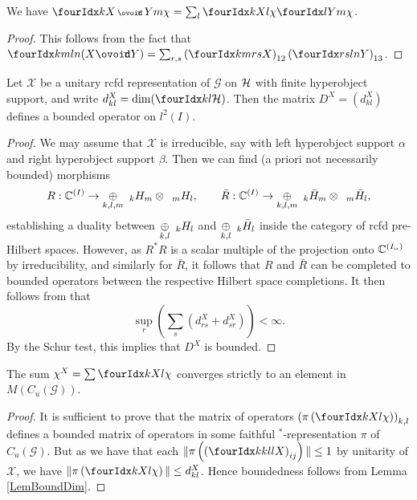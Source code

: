  \begin{Lem}\label{LemBoundDim} We have $\Gr{\chi}{}{X\smCirct Y}{k}{m}= \sum_l \Gr{\chi}{}{X}{k}{l}\Gr{\chi}{}{Y}{l}{m}$.
 \end{Lem}
 
 \begin{proof} 
 This follows from the fact that $\Gr{(X\Circt Y)}{k}{l}{m}{n} = \sum_{r,s} \left(\Gr{X}{k}{r}{m}{s}\right)_{12} \left(\Gr{Y}{r}{l}{s}{n}\right)_{13}$.
 \end{proof}
 
 \begin{Lem} Let $\mathscr{X}$ be a unitary rcfd representation of $\mathscr{G}$ on $\Hsp$ with finite hyperobject support, and write $d^X_{kl} = \dim(\Gru{\Hsp}{k}{l})$. Then the matrix $D^X = (d^X_{kl})$ defines a bounded operator on $l^2(I)$. 
  \end{Lem}
  \begin{proof} We may assume that $\mathscr{X}$ is irreducible, say with left hyperobject support $\alpha$ and right hyperobject support $\beta$. Then we can find (a priori not necessarily bounded) morphisms \[R: \C^{(I)}\rightarrow \underset{k,l,m}{\oplus} \GrDA{H}{k}{m}\otimes \GrDA{H}{m}{l},\qquad \bar{R}: \C^{(I)} \rightarrow   \underset{k,l,m}{\oplus} \GrDA{\bar{H}}{k}{m}\otimes \GrDA{\bar{H}}{m}{l},\] establishing a duality between $\underset{k,l}{\oplus} \GrDA{H}{k}{l}$ and $\underset{k,l}{\oplus}\GrDA{\bar{H}}{k}{l}$ inside the category of rcfd pre-Hilbert spaces. However, as $R^*R$ is a scalar multiple of the projection onto $\C^{(I_{\alpha})}$ by irreducibility, and similarly for $\bar{R}$, it follows that $R$ and $\bar{R}$ can be completed to bounded operators between the respective Hilbert space completions. It then follows from \cite[Lemma A.3.2]{DCY1} that \[\sup_r (\sum_s (d_{rs}^X+d_{sr}^X)) < \infty.\] By the Schur test, this implies that $D^X$ is bounded.
\end{proof} 
   
\begin{Cor} The sum $\chi^X  =\sum \Gr{\chi}{}{X}{k}{l}$ converges strictly to an element in $M(C_u(\mathscr{G}))$. 
\end{Cor} 
 
\begin{proof} It is sufficient to prove that the matrix of operators $\left(\pi\left(\Gr{\chi}{}{X}{k}{l}\right)\right)_{k,l}$ defines a bounded matrix of operators in some faithful $^*$-representation $\pi$ of $C_u(\mathscr{G})$. But as we have that each $\|\pi\left(\left(\Gr{X}{k}{l}{k}{l}\right)_{ij}\right)\|\leq 1$ by unitarity of $\mathscr{X}$, we have $\| \pi\left(\Gr{\chi}{}{X}{k}{l}\right)\| \leq d^X_{kl}$.  Hence boundedness follows from Lemma \ref{LemBoundDim}.
\end{proof} 
 
